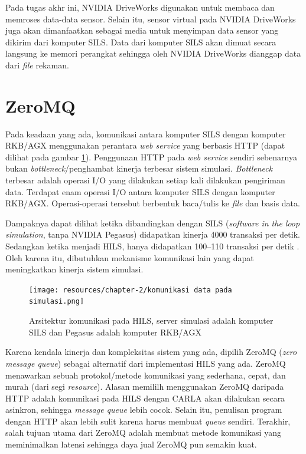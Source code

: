 Pada tugas akhr ini, NVIDIA DriveWorks digunakan untuk membaca dan
memroses data-data sensor. Selain itu, sensor virtual pada NVIDIA DriveWorks
juga akan dimanfaatkan sebagai media untuk menyimpan data sensor yang dikirim
dari komputer SILS. Data dari komputer SILS akan dimuat secara langsung ke
memori perangkat sehingga oleh NVIDIA DriveWorks dianggap data dari
\textit{file} rekaman.

\section{ZeroMQ}

Pada keadaan yang ada, komunikasi antara komputer SILS dengan komputer RKB/AGX
menggunakan perantara \textit{web service} yang berbasis HTTP (dapat dilihat
pada gambar \ref{chapter-2-old-hils}). Penggunaan HTTP pada \textit{web service}
sendiri sebenarnya bukan \textit{bottleneck}/penghambat kinerja terbesar sistem
simulasi. \textit{Bottleneck} terbesar adalah operasi I/O yang dilakukan setiap
kali dilakukan pengiriman data. Terdapat enam operasi I/O antara komputer SILS
dengan komputer RKB/AGX. Operasi-operasi tersebut berbentuk baca/tulis ke
\textit{file} dan basis data.

Dampaknya dapat dilihat ketika dibandingkan dengan SILS (\textit{software
    in the loop simulation}, tanpa NVIDIA Pegasus) didapatkan kinerja 4000 transaksi
per detik. Sedangkan ketika menjadi HILS, hanya didapatkan 100--110 transaksi per
detik \parencite{trilaksono_laporanRispro}. Oleh karena itu, dibutuhkan
mekanisme komunikasi lain yang dapat meningkatkan kinerja sistem simulasi.

\begin{figure}
    \centering
    \texttt{[image: resources/chapter-2/komunikasi
        data pada simulasi.png]}
    \caption{Arsitektur komunikasi pada HILS, server simulasi adalah komputer SILS
        dan Pegasus adalah komputer RKB/AGX \parencite{trilaksono_laporanRispro}}
    \label{chapter-2-old-hils}
\end{figure}

Karena kendala kinerja dan kompleksitas sistem yang ada, dipilih ZeroMQ
(\textit{zero message queue}) sebagai alternatif dari implementasi HILS yang
ada. ZeroMQ menawarkan sebuah protokol/metode komunikasi yang sederhana, cepat,
dan murah (dari segi \textit{resource}). Alasan memililh menggunakan ZeroMQ
daripada HTTP adalah komunikasi pada HILS dengan CARLA akan dilakukan secara
asinkron, sehingga \textit{message queue} lebih cocok. Selain itu, penulisan
program dengan HTTP akan lebih sulit karena harus membuat \textit{queue}
sendiri. Terakhir, salah tujuan utama dari ZeroMQ adalah membuat metode
komunikasi yang meminimalkan latensi sehingga daya jual ZeroMQ pun semakin kuat.

